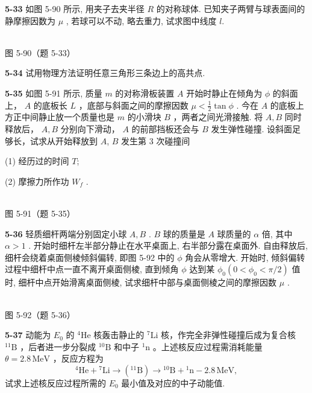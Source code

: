 \textbf{5-33} 如图 5-90 所示, 用夹子去夹半径 $R$ 的对称球体. 已知夹子两臂与球表面间的静摩擦因数为 $\mu$ , 若球可以不动, 略去重力, 试求图中线度 $l$.

\begin{center}
\resizebox{0.46\textwidth}{!}{}\\[4pt]
{\small 图 5-90（题 5-33）}
\end{center}

\newpage

\textbf{5-34} 试用物理方法证明任意三角形三条边上的高共点.

\newpage

\textbf{5-35} 如图 5-91 所示, 质量 $m$ 的对称滑板装置 $A$ 开始时静止在倾角为 $\phi$ 的斜面上， $A$ 的底板长 $L$ ，底部与斜面之间的摩擦因数 $\mu < \frac{1}{2} \tan \phi$ . 今在 $A$ 的底板上方正中间静止放一个质量也是 $m$ 的小滑块 $B$ ，两者之间光滑接触. 将 $A, B$ 同时释放后， $A, B$ 分别向下滑动， $A$ 的前部挡板还会与 $B$ 发生弹性碰撞. 设斜面足够长，试求从开始释放到 $A$, $B$ 发生第 3 次碰撞间

(1) 经历过的时间 $T$;

(2) 摩擦力所作功 $W_{f}$ .

\begin{center}
\resizebox{0.45\textwidth}{!}{}\\[4pt]
{\small 图 5-91（题 5-35）}
\end{center}

\newpage

\textbf{5-36} 轻质细杆两端分别固定小球 $A, B$ . $B$ 球的质量是 $A$ 球质量的 $\alpha$ 倍, 其中 $\alpha > 1$ . 开始时细杆左半部分静止在水平桌面上, 右半部分露在桌面外. 自由释放后, 细杆会绕着桌面侧棱倾斜偏转, 即图 5-92 中的 $\phi$ 角会从零增大. 开始时, 倾斜偏转过程中细杆中点一直不离开桌面侧棱, 直到倾角 $\phi$ 达到某 $\phi_0 (0 < \phi_0 < \pi / 2)$ 值时, 细杆中点开始滑离桌面侧棱, 试求细杆中部与桌面侧棱之间的摩擦因数 $\mu$ .

\begin{center}
\resizebox{0.49\textwidth}{!}{}\\[4pt]
{\small 图 5-92（题 5-36）}
\end{center}

\newpage

\textbf{5-37} 动能为 $E_{0}$ 的 ${}^{4}\mathrm{He}$ 核轰击静止的 ${}^{7}\mathrm{Li}$ 核，作完全非弹性碰撞后成为复合核 ${}^{11}\mathrm{B}$ ，后者进一步分裂成 ${}^{10}\mathrm{B}$ 和中子 ${}^{1}\mathrm{n}$ 。上述核反应过程需消耗能量 $\theta=2.8\,\mathrm{MeV}$ ，反应方程为
\[
{}^{4}\mathrm{He}+{}^{7}\mathrm{Li}\longrightarrow ({}^{11}\mathrm{B})\longrightarrow {}^{10}\mathrm{B}+{}^{1}\mathrm{n}-2.8\,\mathrm{MeV},
\]
试求上述核反应过程所需的 $E_{0}$ 最小值及对应的中子动能值.

